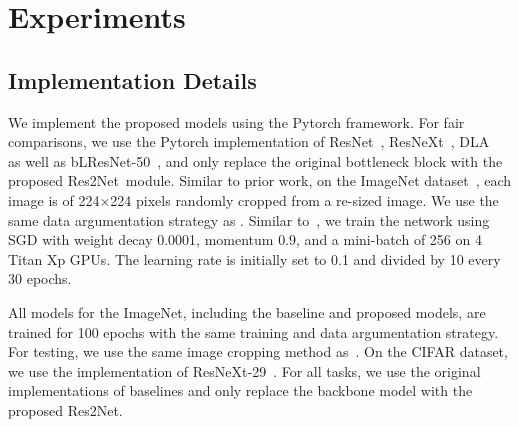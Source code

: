 \documentclass[10pt,journal,cspaper,compsoc]{IEEEtran}
\newcommand{\ourM}{{Res2Net}}
\begin{document}
\section{Experiments}\label{sec:experiments}


\subsection{Implementation Details}
We implement the proposed models using the Pytorch framework.
For fair comparisons, we use the Pytorch implementation of ResNet~\cite{he2016deep},
ResNeXt~\cite{xie2017aggregated}, DLA~\cite{yu2018deep} as well as 
bLResNet-50~\cite{chen2018biglittle},
and only replace the original bottleneck block with the proposed \ourM~module.
%
Similar to prior work, on the ImageNet dataset~\cite{russakovsky2015imagenet},
each image is of 224$\times$224 pixels randomly cropped from
a re-sized image.
%
We use the same data argumentation strategy as \cite{he2016deep,szegedy2016rethinking}.
%
Similar to~\cite{he2016deep},
we train the network using SGD with weight decay 0.0001, momentum 0.9,
and a mini-batch of 256 on 4 Titan Xp GPUs.
%
The learning rate is initially set to 0.1 and divided by 10 every 30 epochs.


All models for the ImageNet, including the baseline and  proposed models,
are trained for 100 epochs with the same training and data argumentation strategy.
%
For testing, we use the same image cropping method as~\cite{he2016deep}.
%
On the CIFAR dataset, we use the implementation of
ResNeXt-29~\cite{xie2017aggregated}.
%
For all tasks, we use the original implementations of baselines and
only replace the backbone model with the proposed \ourM.


\newcommand{\ResNet}{{ResNet-50~\cite{he2016deep}}}
\newcommand{\ResNeXt}{{ResNeXt-50~\cite{xie2017aggregated}}}
\newcommand{\DLA}{{DLA-60~\cite{yu2018deep}}}
\newcommand{\DLAX}{{DLA-X-60~\cite{yu2018deep}}}
\newcommand{\ResNetSE}{{SENet-50~\cite{hu2018senet}}}
\newcommand{\ResNeXtSE}{{SENeXt-50~\cite{hu2018senet}}}
\newcommand{\InceptionV}{{InceptionV3~\cite{szegedy2016rethinking}}}
\newcommand{\BLResNet}{{bLResNet-50~\cite{chen2018biglittle}}}
\end{document}
